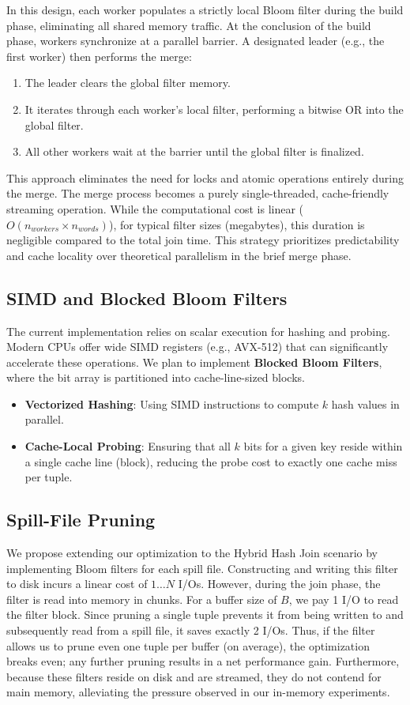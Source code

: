 \documentclass[sigconf,nonacm]{acmart}
\begin{document}
In this design, each worker populates a strictly local Bloom filter during the build phase, eliminating all shared memory traffic. At the conclusion of the build phase, workers synchronize at a parallel barrier. A designated leader (e.g., the first worker) then performs the merge:
\begin{enumerate}
    \item The leader clears the global filter memory.
    \item It iterates through each worker's local filter, performing a bitwise OR into the global filter.
    \item All other workers wait at the barrier until the global filter is finalized.
\end{enumerate}

This approach eliminates the need for locks and atomic operations entirely during the merge. The merge process becomes a purely single-threaded, cache-friendly streaming operation. While the computational cost is linear ($O(n_{workers} \times n_{words})$), for typical filter sizes (megabytes), this duration is negligible compared to the total join time. This strategy prioritizes predictability and cache locality over theoretical parallelism in the brief merge phase.

\subsection{SIMD and Blocked Bloom Filters}
The current implementation relies on scalar execution for hashing and probing. Modern CPUs offer wide SIMD registers (e.g., AVX-512) that can significantly accelerate these operations. We plan to implement \textbf{Blocked Bloom Filters}, where the bit array is partitioned into cache-line-sized blocks.
\begin{itemize}
    \item \textbf{Vectorized Hashing}: Using SIMD instructions to compute $k$ hash values in parallel.
    \item \textbf{Cache-Local Probing}: Ensuring that all $k$ bits for a given key reside within a single cache line (block), reducing the probe cost to exactly one cache miss per tuple.
\end{itemize}

\subsection{Spill-File Pruning}
We propose extending our optimization to the Hybrid Hash Join scenario by implementing Bloom filters for each spill file. Constructing and writing this filter to disk incurs a linear cost of $1 \dots N$ I/Os. However, during the join phase, the filter is read into memory in chunks. For a buffer size of $B$, we pay 1 I/O to read the filter block. Since pruning a single tuple prevents it from being written to and subsequently read from a spill file, it saves exactly 2 I/Os. Thus, if the filter allows us to prune even one tuple per buffer (on average), the optimization breaks even; any further pruning results in a net performance gain. Furthermore, because these filters reside on disk and are streamed, they do not contend for main memory, alleviating the pressure observed in our in-memory experiments.
\end{document}

